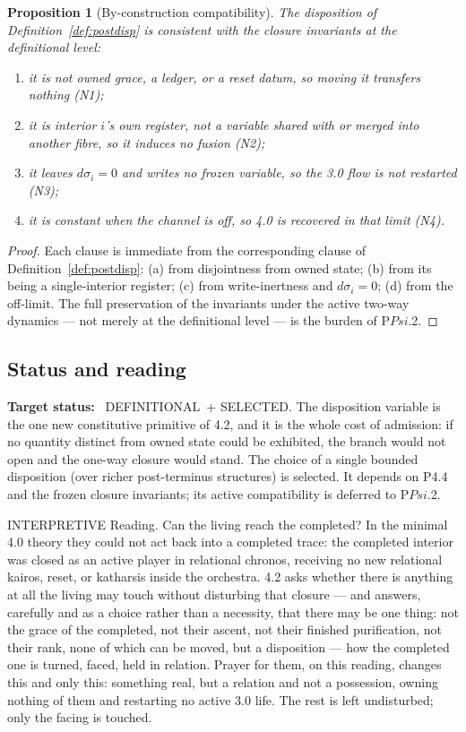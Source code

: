 \documentclass[11pt,a4paper]{article}
\def\Psi{Psi}%
\def\emph#1{#1}%
\newcommand{\stDef}{\textcolor{cDef}{\textsf{\small DEFINITIONAL}}}
\newcommand{\stSelected}{\textcolor{cSel}{\textsf{\small SELECTED}}}
\newcommand{\stInterp}{\textcolor{cInt}{\textsf{\small INTERPRETIVE}}}
\theoremstyle{definition}
\theoremstyle{plain}
\newtheorem{proposition}[definition]{Proposition}
\theoremstyle{remark}
\begin{document}
\begin{proposition}[By-construction compatibility]\label{prop:psi0adm}
The disposition of Definition~\ref{def:postdisp} is consistent with the closure invariants at
the definitional level:
\begin{enumerate}[label=\textup{(\alph*)},leftmargin=1.2cm]
\item it is not owned grace, a ledger, or a reset datum, so moving it transfers nothing (N1);
\item it is interior \(i\)'s own register, not a variable shared with or merged into another
fibre, so it induces no fusion (N2);
\item it leaves \(d\sigma_i=0\) and writes no frozen variable, so the 3.0 flow is not
restarted (N3);
\item it is constant when the channel is off, so 4.0 is recovered in that limit (N4).
\end{enumerate}
\end{proposition}

\begin{proof}
Each clause is immediate from the corresponding clause of Definition~\ref{def:postdisp}:
(a) from disjointness from owned state; (b) from its being a single-interior register; (c)
from write-inertness and \(d\sigma_i=0\); (d) from the off-limit. The full preservation of the
invariants under the \emph{active} two-way dynamics --- not merely at the definitional level
--- is the burden of P$\Psi$.2. \qedhere
\end{proof}

\subsection{Status and reading}

\textbf{Target status:}~
\stDef\ + \stSelected. The disposition variable is the one new constitutive primitive of 4.2,
and it is the whole cost of admission: if no quantity distinct from owned state could be
exhibited, the branch would not open and the one-way closure would stand. The choice of a
single bounded disposition (over richer post-terminus structures) is \emph{selected}. It
depends on P4.4 and the frozen closure invariants; its active compatibility is deferred to
P$\Psi$.2.

\medskip
\stInterp\quad
\emph{Reading.}
Can the living reach the completed? In the minimal 4.0 theory they could not act back into a
completed trace: the completed interior was closed as an active player in relational chronos,
receiving no new relational kairos, reset, or katharsis inside the orchestra. 4.2 asks whether
there is anything at all the living may touch without disturbing that closure --- and answers,
carefully and as a choice rather than a necessity, that there may be one thing: not the grace
of the completed, not their ascent, not their finished purification, not their rank, none of
which can be moved, but a \emph{disposition} --- how the completed one is turned, faced, held
in relation. Prayer for them, on this reading, changes this and only this: something real, but
a relation and not a possession, owning nothing of them and restarting no active 3.0 life. The
rest is left undisturbed; only the facing is touched.
\end{document}
